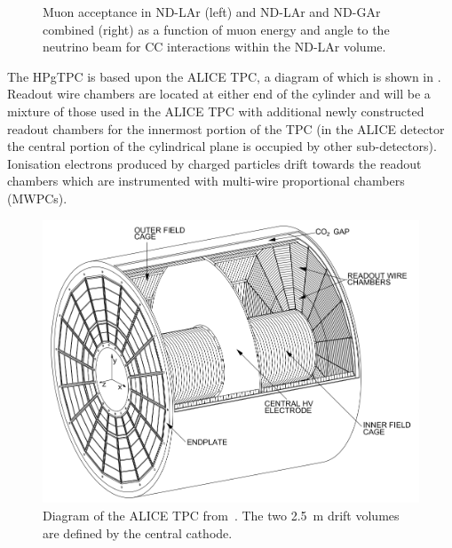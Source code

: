 \begin{figure}[h]
  \begin{minipage}[t]{0.5\textwidth}
    \begin{adjustbox}{max totalsize={\textwidth}, center}
      
    \end{adjustbox}
  \end{minipage}
  \hfill
  \begin{minipage}[t]{0.5\textwidth}
    \begin{adjustbox}{max totalsize={\textwidth}, center}
      
    \end{adjustbox}
  \end{minipage}
  \caption[Muon acceptance in the DUNE ND]{Muon acceptance in ND-LAr (left) and ND-LAr and ND-GAr combined (right) as a function of muon energy and angle to the neutrino beam for \numu CC interactions within the ND-LAr volume.}
  \label{fig:muonAccND}
\end{figure}

The HPgTPC is based upon the ALICE TPC, a diagram of which is shown in .
Readout wire chambers are located at either end of the cylinder and will be a mixture of those used in the ALICE TPC with additional newly constructed readout chambers for the innermost portion of the TPC (in the ALICE detector the central portion of the cylindrical plane is occupied by other sub-detectors).
Ionisation electrons produced by charged particles drift towards the readout chambers which are instrumented with multi-wire proportional chambers (MWPCs).

\begin{figure}[h]
  \centering
  \includegraphics[width=.8\linewidth]{files/figures/dune_detector/aliceTPC}
  \caption[Diagram of the ALICE TPC]{Diagram of the ALICE TPC from~\cite{alicePaper}. The two \SI{2.5}{\metre} drift volumes are defined by the central cathode.}
  \label{fig:aliceTPC}
\end{figure}

